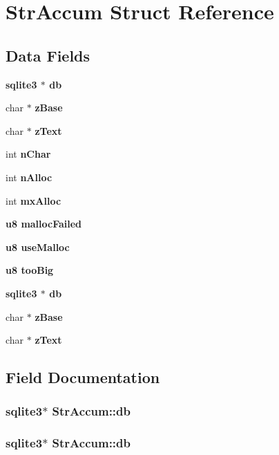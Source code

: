 \section{Str\-Accum Struct Reference}
\label{structStrAccum}
\subsection*{Data Fields}
\begin{CompactItemize}
\item 
\bf{sqlite3} $\ast$ \bf{db}
\item 
char $\ast$ \bf{z\-Base}
\item 
char $\ast$ \bf{z\-Text}
\item 
int \bf{n\-Char}
\item 
int \bf{n\-Alloc}
\item 
int \bf{mx\-Alloc}
\item 
\bf{u8} \bf{malloc\-Failed}
\item 
\bf{u8} \bf{use\-Malloc}
\item 
\bf{u8} \bf{too\-Big}
\item 
\bf{sqlite3} $\ast$ \bf{db}
\item 
char $\ast$ \bf{z\-Base}
\item 
char $\ast$ \bf{z\-Text}
\end{CompactItemize}


\subsection{Field Documentation}
\subsubsection{\setlength{\rightskip}{0pt plus 5cm}\bf{sqlite3}$\ast$ \bf{Str\-Accum::db}}\label{structStrAccum_9ff26a16f8503f46d0097b1780c8f4be}


\subsubsection{\setlength{\rightskip}{0pt plus 5cm}\bf{sqlite3}$\ast$ \bf{Str\-Accum::db}}\label{structStrAccum_9ff26a16f8503f46d0097b1780c8f4be}


